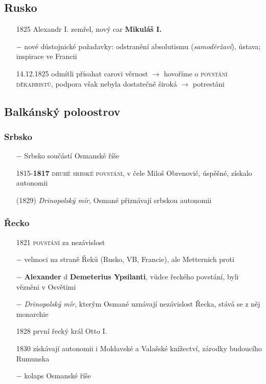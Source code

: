 \documentclass{article}
\begin{document}
\subsection*{Rusko}
\begin{itemize}
    \vspace{-0.5em}
    \setlength\itemsep{0.15em}
    \item[1825] Alexandr I. zemřel, nový car \textbf{Mikuláš I.}
    \item[$-$] nové důstojnické požadavky: odstranění absolutismu (\textit{samoděržaví}), ústava; inspirace ve Francii
    \item[14.12.1825] odmítli přísahat carovi věrnost $\rightarrow$ hovoříme o \textsc{povstání děkabristů}, podpora však nebyla dostatečně široká $\rightarrow$ potrestáni
\end{itemize}


\subsection*{Balkánský poloostrov}
\subsubsection*{Srbsko}
\begin{itemize}
    \vspace{-0.5em}
    \setlength\itemsep{0.15em}
    \item[$-$] Srbsko součástí Osmanské říše
    \item[1815-\textbf{1817}] \textsc{druhé srbské povstání}, v čele Miloš Obrenovič, úspěšné, získalo autonomii
    \item[(1829)] \textit{Drinopolský mír}, Osmané přiznávají srbskou autonomii
\end{itemize}

\subsubsection*{Řecko}
\begin{itemize}
    \vspace{-0.5em}
    \setlength\itemsep{0.15em}
    \item[1821] \textsc{povstání} za nezávislost
    \item[$-$] velmoci na straně Řeků (Rusko, VB, Francie), ale Metternich proti
    \item[$-$] \textbf{Alexander} d \textbf{Demeterius Ypsilanti}, vůdce řeckého povstání, byli vězněni v Osvětimi
    \item[$-$] \textit{Drinopolský mír}, kterým Osmané uznávají nezávislost Řecka, stává se z něj monarchie
    \item[1828] první řecký král Otto I.
    \item[1830] získávají autonomii i Moldavské a Valašské knížectví, zárodky budoucího Rumunska
    \item[$-$] kolaps Osmanské říše
\end{itemize}
\end{document}
